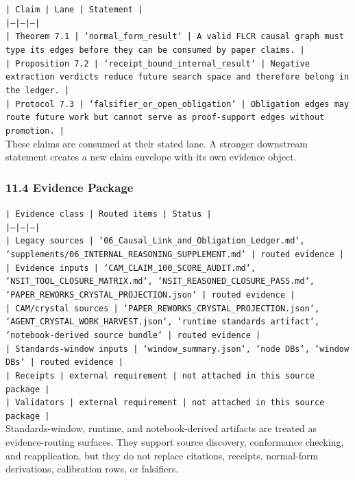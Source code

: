\documentclass[11pt]{article}
\begin{document}
\noindent\texttt{| Claim | Lane | Statement |}\\
\noindent\texttt{|---|---|---|}\\
\noindent\texttt{| Theorem 7.1 | `normal\_form\_result` | A valid FLCR causal graph must type its edges before they can be consumed by paper claims. |}\\
\noindent\texttt{| Proposition 7.2 | `receipt\_bound\_internal\_result` | Negative extraction verdicts reduce future search space and therefore belong in the ledger. |}\\
\noindent\texttt{| Protocol 7.3 | `falsifier\_or\_open\_obligation` | Obligation edges may route future work but cannot serve as proof-support edges without promotion. |}\\

These claims are consumed at their stated lane. A stronger downstream statement
creates a new claim envelope with its own evidence object.

\subsubsection*{11.4 Evidence Package}

\noindent\texttt{| Evidence class | Routed items | Status |}\\
\noindent\texttt{|---|---|---|}\\
\noindent\texttt{| Legacy sources | `06\_Causal\_Link\_and\_Obligation\_Ledger.md`, `supplements/06\_INTERNAL\_REASONING\_SUPPLEMENT.md` | routed evidence |}\\
\noindent\texttt{| Evidence inputs | `CAM\_CLAIM\_100\_SCORE\_AUDIT.md`, `NSIT\_TOOL\_CLOSURE\_MATRIX.md`, `NSIT\_REASONED\_CLOSURE\_PASS.md`, `PAPER\_REWORKS\_CRYSTAL\_PROJECTION.json` | routed evidence |}\\
\noindent\texttt{| CAM/crystal sources | `PAPER\_REWORKS\_CRYSTAL\_PROJECTION.json`, `AGENT\_CRYSTAL\_WORK\_HARVEST.json`, `runtime standards artifact`, `notebook-derived source bundle` | routed evidence |}\\
\noindent\texttt{| Standards-window inputs | `window\_summary.json`, `node DBs`, `window DBs` | routed evidence |}\\
\noindent\texttt{| Receipts | external requirement | not attached in this source package |}\\
\noindent\texttt{| Validators | external requirement | not attached in this source package |}\\

Standards-window, runtime, and notebook-derived artifacts are treated
as evidence-routing surfaces. They support source discovery, conformance
checking, and reapplication, but they do not replace citations, receipts,
normal-form derivations, calibration rows, or falsifiers.
\end{document}
